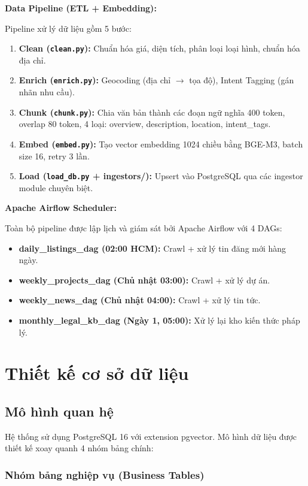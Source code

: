 \textbf{Data Pipeline (ETL + Embedding):}

Pipeline xử lý dữ liệu gồm 5 bước:
\begin{enumerate}
    \item \textbf{Clean (\texttt{clean.py}):} Chuẩn hóa giá, diện tích, phân loại loại hình, chuẩn hóa địa chỉ.
    \item \textbf{Enrich (\texttt{enrich.py}):} Geocoding (địa chỉ $\rightarrow$ tọa độ), Intent Tagging (gán nhãn nhu cầu).
    \item \textbf{Chunk (\texttt{chunk.py}):} Chia văn bản thành các đoạn ngữ nghĩa 400 token, overlap 80 token, 4 loại: overview, description, location, intent\_tags.
    \item \textbf{Embed (\texttt{embed.py}):} Tạo vector embedding 1024 chiều bằng BGE-M3, batch size 16, retry 3 lần.
    \item \textbf{Load (\texttt{load\_db.py} + ingestors/):} Upsert vào PostgreSQL qua các ingestor module chuyên biệt.
\end{enumerate}

\textbf{Apache Airflow Scheduler:}

Toàn bộ pipeline được lập lịch và giám sát bởi Apache Airflow với 4 DAGs:
\begin{itemize}
    \item \textbf{daily\_listings\_dag (02:00 HCM):} Crawl + xử lý tin đăng mới hàng ngày.
    \item \textbf{weekly\_projects\_dag (Chủ nhật 03:00):} Crawl + xử lý dự án.
    \item \textbf{weekly\_news\_dag (Chủ nhật 04:00):} Crawl + xử lý tin tức.
    \item \textbf{monthly\_legal\_kb\_dag (Ngày 1, 05:00):} Xử lý lại kho kiến thức pháp lý.
\end{itemize}

\section{Thiết kế cơ sở dữ liệu}

\subsection{Mô hình quan hệ}

Hệ thống sử dụng PostgreSQL 16 với extension pgvector. Mô hình dữ liệu được thiết kế xoay quanh 4 nhóm bảng chính:

\subsubsection{Nhóm bảng nghiệp vụ (Business Tables)}

